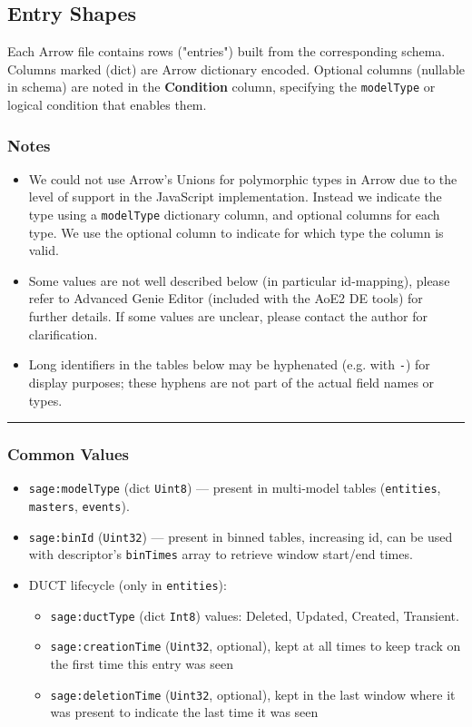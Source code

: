 \subsection{Entry Shapes}

Each Arrow file contains rows ("entries") built from the corresponding schema.
Columns marked (dict) are Arrow dictionary encoded.
Optional columns (nullable in schema) are noted in the \textbf{Condition} column, specifying the \texttt{modelType} or logical condition that enables them.

\subsubsection*{Notes}
\begin{itemize}
  \item We could not use Arrow's Unions for polymorphic types in Arrow due to the level of support in the JavaScript implementation. Instead we indicate the type using a \texttt{modelType} dictionary column, and optional columns for each type. We use the optional column to indicate for which type the column is valid.
  \item Some values are not well described below (in particular id-mapping), please refer to Advanced Genie Editor (included with the AoE2 DE tools) for further details. If some values are unclear, please contact the author for clarification.
  \item Long identifiers in the tables below may be hyphenated (e.g. with \texttt{-}) for display purposes; these hyphens are not part of the actual field names or types.
\end{itemize}
\par\noindent\rule{\textwidth}{0.4pt}

\subsubsection*{Common Values}

\begin{itemize}
  \item \texttt{sage:modelType} (dict \texttt{Uint8}) — present in multi‑model tables (\texttt{entities}, \texttt{masters}, \texttt{events}).
  \item \texttt{sage:binId} (\texttt{Uint32}) — present in binned tables, increasing id, can be used with descriptor's \texttt{binTimes} array to retrieve window start/end times.
  \item DUCT lifecycle (only in \texttt{entities}):
    \begin{itemize}
      \item \texttt{sage:ductType} (dict \texttt{Int8}) values: Deleted, Updated, Created, Transient.
      \item \texttt{sage:creationTime} (\texttt{Uint32}, optional), kept at all times to keep track on the first time this entry was seen
      \item \texttt{sage:deletionTime} (\texttt{Uint32}, optional), kept in the last window where it was present to indicate the last time it was seen
    \end{itemize}
\end{itemize}

